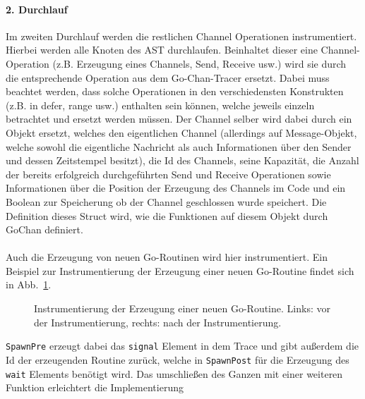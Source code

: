 \paragraph{2. Durchlauf} Im zweiten Durchlauf werden die restlichen 
Channel Operationen instrumentiert. Hierbei werden alle Knoten des 
AST durchlaufen. Beinhaltet dieser eine Channel-Operation (z.B. Erzeugung 
eines Channels, Send, Receive usw.) wird sie durch die entsprechende 
Operation aus dem Go-Chan-Tracer ersetzt. Dabei muss beachtet werden,
dass solche Operationen in den verschiedensten Konstrukten (z.B. in defer, 
range usw.) enthalten sein können, welche jeweils einzeln betrachtet und 
ersetzt werden müssen. Der Channel selber wird dabei durch ein Objekt ersetzt, 
welches den eigentlichen Channel (allerdings auf Message-Objekt, welche 
sowohl die eigentliche Nachricht als auch Informationen über den Sender und 
dessen Zeitstempel besitzt), die Id des Channels, seine Kapazität, 
die Anzahl der bereits erfolgreich durchgeführten Send und Receive Operationen
sowie Informationen über die Position der Erzeugung des Channels im Code
und ein Boolean zur Speicherung ob der Channel geschlossen wurde
speichert. Die Definition dieses Struct wird, wie die Funktionen auf diesem 
Objekt durch GoChan definiert.\\\\Auch die Erzeugung von neuen Go-Routinen 
wird hier instrumentiert. Ein Beispiel zur Instrumentierung der Erzeugung einer 
neuen Go-Routine findet sich in Abb.~\ref{Chap:Instrumenter-Sec:Instrumenter-Fig:GoRoutine}.
\begin{figure}[h!]
  \begin{minipage}[t]{0.3\textwidth}
    
  \end{minipage}
  \begin{minipage}[t]{0.65\textwidth}
    
  \end{minipage}
  \caption{Instrumentierung der Erzeugung einer neuen Go-Routine. Links: vor der 
    Instrumentierung, rechts: nach der Instrumentierung.}
  \label{Chap:Instrumenter-Sec:Instrumenter-Fig:GoRoutine}
\end{figure}
\texttt{SpawnPre} erzeugt dabei das \texttt{signal} Element in dem Trace 
und gibt außerdem die Id der erzeugenden Routine zurück, welche in \texttt{SpawnPost}
für die Erzeugung des \texttt{wait} Elements benötigt wird. Das umschließen 
des Ganzen mit einer weiteren Funktion erleichtert die Implementierung 
